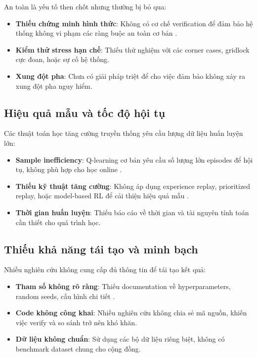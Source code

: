 An toàn là yếu tố then chốt nhưng thường bị bỏ qua:

\begin{itemize}
    \item \textbf{Thiếu chứng minh hình thức}: Không có cơ chế verification để đảm bảo hệ thống không vi phạm các ràng buộc an toàn cơ bản \cite{Mirchandani2001}.
    
    \item \textbf{Kiểm thử stress hạn chế}: Thiếu thử nghiệm với các corner cases, gridlock cực đoan, hoặc sự cố hệ thống.
    
    \item \textbf{Xung đột pha}: Chưa có giải pháp triệt để cho việc đảm bảo không xảy ra xung đột pha nguy hiểm.
\end{itemize}

\subsection{Hiệu quả mẫu và tốc độ hội tụ}

Các thuật toán học tăng cường truyền thống yêu cầu lượng dữ liệu huấn luyện lớn:

\begin{itemize}
    \item \textbf{Sample inefficiency}: Q-learning cơ bản yêu cầu số lượng lớn episodes để hội tụ, không phù hợp cho học online \cite{Watkins1992}.
    
    \item \textbf{Thiếu kỹ thuật tăng cường}: Không áp dụng experience replay, prioritized replay, hoặc model-based RL để cải thiện hiệu quả mẫu \cite{Gao2017}.
    
    \item \textbf{Thời gian huấn luyện}: Thiếu báo cáo về thời gian và tài nguyên tính toán cần thiết cho quá trình học.
\end{itemize}

\subsection{Thiếu khả năng tái tạo và minh bạch}

Nhiều nghiên cứu không cung cấp đủ thông tin để tái tạo kết quả:

\begin{itemize}
    \item \textbf{Tham số không rõ ràng}: Thiếu documentation về hyperparameters, random seeds, cấu hình chi tiết \cite{Shaikh2022}.
    
    \item \textbf{Code không công khai}: Nhiều nghiên cứu không chia sẻ mã nguồn, khiến việc verify và so sánh trở nên khó khăn.
    
    \item \textbf{Dữ liệu không chuẩn}: Sử dụng các bộ dữ liệu riêng biệt, không có benchmark dataset chung cho cộng đồng.
\end{itemize}

